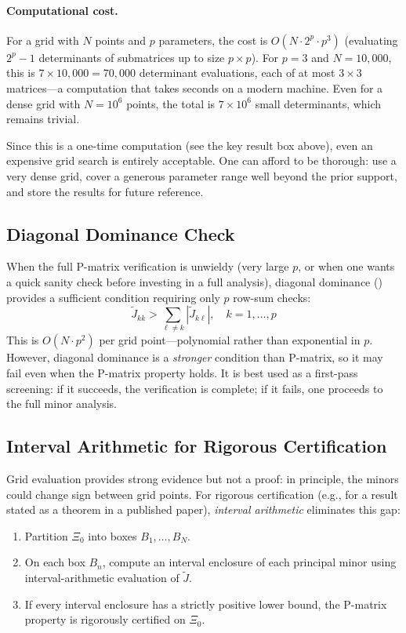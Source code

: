 \documentclass[11pt,a4paper]{article}
\theoremstyle{definition}
\begin{document}
\paragraph{Computational cost.} For a grid with $N$ points and $p$ parameters,
the cost is $O(N \cdot 2^p \cdot p^3)$ (evaluating $2^p - 1$ determinants of
submatrices up to size $p \times p$). For $p = 3$ and $N = 10{,}000$, this
is $7 \times 10{,}000 = 70{,}000$ determinant evaluations, each of at most
$3 \times 3$ matrices---a computation that takes seconds on a modern machine.
Even for a dense grid with $N = 10^6$ points, the total is $7 \times 10^6$
small determinants, which remains trivial.

Since this is a one-time computation (see the key result box above), even an
expensive grid search is entirely acceptable. One can afford to be thorough:
use a very dense grid, cover a generous parameter range well beyond the prior
support, and store the results for future reference.

\subsection{Diagonal Dominance Check}

When the full P-matrix verification is unwieldy (very large $p$, or when one
wants a quick sanity check before investing in a full analysis), diagonal
dominance () provides a sufficient condition requiring
only $p$ row-sum checks:
\begin{equation}
    \widetilde{J}_{kk} > \sum_{\ell \neq k}
    |\widetilde{J}_{k\ell}|, \quad k = 1, \ldots, p
\end{equation}
This is $O(N \cdot p^2)$ per grid point---polynomial rather than exponential
in $p$. However, diagonal dominance is a \emph{stronger} condition than
P-matrix, so it may fail even when the P-matrix property holds. It is best
used as a first-pass screening: if it succeeds, the verification is complete;
if it fails, one proceeds to the full minor analysis.

\subsection{Interval Arithmetic for Rigorous Certification}

Grid evaluation provides strong evidence but not a proof: in principle, the
minors could change sign between grid points. For rigorous certification
(e.g., for a result stated as a theorem in a published paper), \emph{interval
arithmetic} eliminates this gap:
\begin{enumerate}
    \item Partition $\Xi_0$ into boxes $B_1, \ldots, B_N$.
    \item On each box $B_n$, compute an interval enclosure of each
    principal minor using interval-arithmetic evaluation of $\widetilde{J}$.
    \item If every interval enclosure has a strictly positive lower bound,
    the P-matrix property is rigorously certified on $\Xi_0$.
\end{enumerate}
\end{document}
